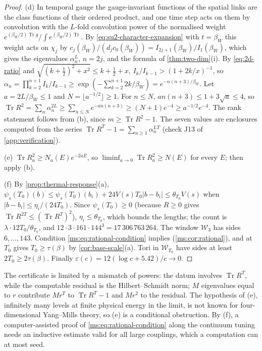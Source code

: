 \documentclass[11pt,a4paper]{amsart}
\theoremstyle{definition}
\theoremstyle{remark}
\numberwithin{equation}{section}
\DeclareMathOperator{\Tr}{Tr}        %
\newcommand{\Wwin}{\mathcal{W}}      %
\newcommand{\abs}[1]{\lvert #1\rvert}      %
\newcommand{\psiT}[2]{\psi_{#1}(#2)}       %
\newcommand{\Vol}[1]{V(#1)}                %
\newcommand{\Bstar}{\text{\upshape(B$^{*}$)}}       %
\newcommand{\betaW}{\beta_{W}}             %
\begin{document}
\begin{proof}
(d) In temporal gauge the gauge-invariant functions of the spatial links are the class functions of their ordered product, and one time step acts on them by convolution with the $L$-fold convolution power of the normalised weight $e^{(\betaW/2)\Tr g}/\int e^{(\betaW/2)\Tr}$. By \eqref{eq:su2-character-expansion} with $t=\betaW$ this weight acts on $\chi_j$ by $c_j(\betaW)/(d_jc_0(\betaW))=I_{2j+1}(\betaW)/I_1(\betaW)$, which gives the eigenvalues $\alpha_n^L$, $n=2j$, and the formula of \cref{thm:two-dim}(i). By \eqref{eq:2d-ratio} and $\sqrt{(k+\frac12)^2+x^2}\le k+\frac12+x$, $I_k/I_{k-1}>(1+2k/x)^{-1}$, so $\alpha_n=\prod_{k=2}^{n+1}I_k/I_{k-1}\ge\exp(-\sum_{k=2}^{n+1}2k/\betaW)=e^{-n(n+3)/\betaW}$. Let $a=2L/\betaW\le1$ and $N=\lfloor a^{-1/2}\rfloor\ge1$. For $n\le N$, $an(n+3)\le1+3\sqrt a\le4$, so $\Tr R^2=\sum_n\alpha_n^{2L}\ge\sum_{n\le N}e^{-an(n+3)}\ge(N+1)e^{-4}\ge a^{-1/2}e^{-4}$. The rank statement follows from (b), since $m\ge\Tr R^2-1$. The seven values are enclosures computed from the series $\Tr R^T-1=\sum_{n\ge1}\alpha_n^{LT}$ (check J13 of \cref{app:verification}).

(e) $\Tr R_a^2\ge N_a(E)e^{-2aE}$, so $\liminf_{a\to0}\Tr R_a^2\ge N(E)$ for every $E$; then apply (b).

(f) By \cref{prop:thermal-response}(a), $\psiT{s}{T_0}(b)\le\psiT{s}{T_0}(b_i)+24\Vol sT_0\abs{b-b_i}\le\theta_{T_0}\Vol s$ when $\abs{b-b_i}\le\eta_i/(24T_0)$. Since $\psiT{s}{T_0}\ge0$ (because $R\ge0$ gives $\Tr R^{2T}\le(\Tr R^T)^2$), $\eta_i\le\theta_{T_0}$, which bounds the lengths; the count is $\lambda\cdot12T_0/\theta_{T_0}$, and $12\cdot3\cdot161\cdot144^3=17\,306\,763\,264$. The window $\Wwin_3$ has sides $6,\dots,143$. Condition \eqref{ms:eq:rational-condition} implies \Bstar{} (\cref{ms:cor:rational}), and \Bstar{} at $T_0$ gives $T_0\ge\tau(\beta)$ by \cref{cor:base-scale}(a). Tori in $\Wwin_{T_0}$ have sides at least $2T_0\ge2\tau(\beta)$. Finally $\varepsilon(c)=12(\log c+5.42)/c\to0$.
\end{proof}

The certificate is limited by a mismatch of powers: the datum involves $\Tr R^T$, while the computable residual is the Hilbert--Schmidt norm; $M$ eigenvalues equal to $r$ contribute $Mr^T$ to $\Tr R^T-1$ and $Mr^2$ to the residual. The hypothesis of (e), infinitely many levels at finite physical energy in the limit, is not known for four-dimensional Yang--Mills theory, so (e) is a conditional obstruction. By (f), a computer-assisted proof of \eqref{ms:eq:rational-condition} along the continuum tuning needs an inductive estimate valid for all large couplings, which a computation can at most seed.
\end{document}
